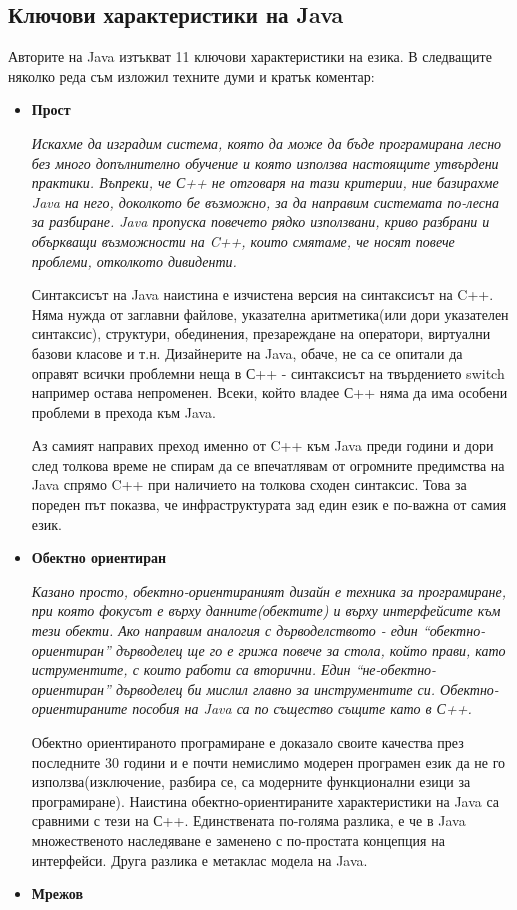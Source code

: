 \subsection{Ключови характеристики на Java}
Авторите на Java изтъкват 11 ключови характеристики на езика. В
следващите няколко реда съм изложил техните думи и кратък коментар:
\begin{itemize}
\item \textbf{Прост}
 
  \emph{Искахме да изградим система, която да може да бъде програмирана
    лесно без много допълнително обучение и която използва настоящите
    утвърдени практики. Въпреки, че С++ не отговаря на тази критерии,
    ние базирахме Java на него, доколкото бе възможно, за да направим
    системата по-лесна за разбиране. Java пропуска повечето рядко
    използвани, криво разбрани и объркващи възможности на C++, които
    смятаме, че носят повече проблеми, отколкото дивиденти.}

  Синтаксисът на Java наистина е изчистена версия на синтаксисът на
  C++. Няма нужда от заглавни файлове, указателна аритметика(или дори
  указателен синтаксис), структури, обединения, презареждане на
  оператори, виртуални базови класове и т.н. Дизайнерите на Java,
  обаче, не са се опитали да оправят всички проблемни неща в С++ -
  синтаксисът на твърдението switch например остава непроменен. Всеки,
  който владее С++ няма да има особени проблеми в прехода към Java.
  
  Аз самият направих преход именно от C++ към Java преди години и дори
  след толкова време не спирам да се впечатлявам от огромните
  предимства на Java спрямо C++ при наличието на толкова сходен
  синтаксис. Това за пореден път показва, че инфраструктурата зад един
  език е по-важна от самия език.
\item \textbf{Обектно ориентиран}

    \emph{Казано просто, обектно-ориентираният дизайн е техника за
    програмиране, при която фокусът е върху данните(обектите) и върху
    интерфейсите към тези обекти. Ако направим аналогия с
    дърводелството - един "`обектно-ориентиран"' дърводелец ще го е
    грижа повече за стола, който прави, като иструментите, с които
    работи са вторични. Един "`не-обектно-ориентиран"' дърводелец би
    мислил главно за инструментите си. Обектно-ориентираните пособия
    на Java са по същество същите като в С++.}

  Обектно ориентираното програмиране е доказало своите качества през
  последните 30 години и е почти немислимо модерен програмен език да не
  го използва(изключение, разбира се, са модерните функционални езици
  за програмиране). Наистина обектно-ориентираните характеристики на
  Java са сравними с тези на С++. Единствената по-голяма разлика, е че
  в Java множественото наследяване е заменено с по-простата концепция
  на интерфейси. Друга разлика е метаклас модела на Java.
  \item \textbf{Мрежов}


\end{itemize}
